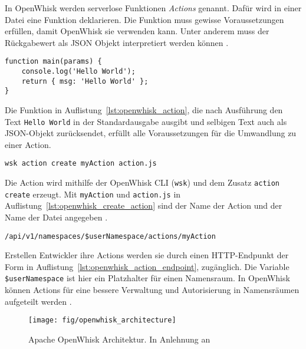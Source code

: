 In OpenWhisk werden serverlose Funktionen \emph{Actions} genannt.
Dafür wird in einer Datei eine Funktion deklarieren.
Die Funktion muss gewisse Voraussetzungen erfüllen,
damit OpenWhisk sie verwenden kann.
Unter anderem muss der Rückgabewert als JSON Objekt
interpretiert werden können \cite{OpenWhiskGithubActions}.\\

\begin{lstlisting}[caption={Hello World JS Funktion. In Anlehnung an \cite{OpenWhiskGithub} \cite{OpenWhiskGithubActions}}, label={lst:openwhisk_action}]
function main(params) {
    console.log('Hello World');
    return { msg: 'Hello World' };
}
\end{lstlisting}

Die Funktion in Auflistung~\ref{lst:openwhisk_action},
die nach Ausführung den Text \texttt{Hello World}
in der Standardausgabe ausgibt und selbigen Text
auch als JSON-Objekt zurücksendet, erfüllt alle Voraussetzungen
für die Umwandlung zu einer Action.\\

\begin{lstlisting}[caption=Erstellen einer Action \cite{OpenWhiskGithub}, label={lst:openwhisk_create_action}]
wsk action create myAction action.js
\end{lstlisting}

Die Action wird mithilfe der OpenWhisk CLI (\texttt{wsk})
und dem Zusatz \texttt{action create} erzeugt.
Mit \texttt{myAction} und \texttt{action.js} 
in Auflistung~\ref{lst:openwhisk_create_action}
sind der Name der Action und der Name der Datei angegeben
\cite{OpenWhiskGithub}.\\

\begin{lstlisting}[caption=Action Endpunkt \cite{OpenWhiskGithub}, label={lst:openwhisk_action_endpoint}]
/api/v1/namespaces/$userNamespace/actions/myAction
\end{lstlisting}

Erstellen Entwickler ihre Actions werden sie durch
einen HTTP-Endpunkt der Form in Auflistung~\ref{lst:openwhisk_action_endpoint},
zugänglich.
Die Variable \texttt{\$userNamespace} ist hier ein
Platzhalter für einen Namensraum.
In OpenWhisk können Actions für eine bessere
Verwaltung und Autorisierung in Namensräumen aufgeteilt werden
\cite{OpenWhiskGithub}.

\begin{figure}
    \centering
    \texttt{[image: fig/openwhisk\_architecture]}
    \caption{Apache OpenWhisk Architektur. In Anlehnung an \cite{OpenWhiskGithub}}
    \label{fig:openwhisk_architecture}
\end{figure}

